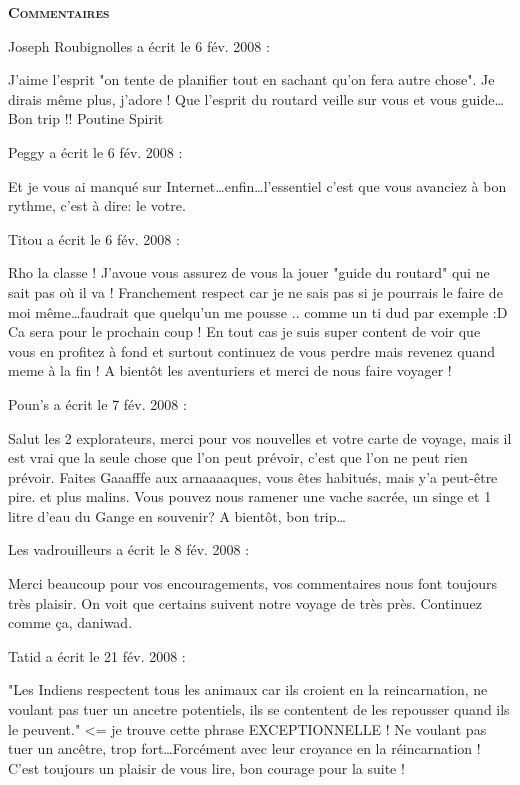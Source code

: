 \bigskip
\textbf{\textsc{Commentaires}}

\medskip
Joseph Roubignolles a écrit le 6 fév. 2008 :
\begin{displayquote}
J'aime l'esprit "on tente de planifier tout en sachant qu'on fera autre chose". Je dirais même plus, j'adore ! Que l'esprit du routard veille sur vous et vous guide\dots
Bon trip !!
Poutine Spirit
\end{displayquote}

\medskip
Peggy a écrit le 6 fév. 2008 :
\begin{displayquote}
Et je vous ai manqué sur Internet\dots enfin\dots l'essentiel c'est que vous avanciez à bon rythme, c'est à dire: le votre.
\end{displayquote}

\medskip
Titou a écrit le 6 fév. 2008 :
\begin{displayquote}
Rho la classe ! J'avoue vous assurez de vous la jouer "guide du routard" qui ne sait pas où il va ! Franchement respect car je ne sais pas si je pourrais le faire de moi même\dots faudrait que quelqu'un me pousse .. comme un ti dud par exemple :D Ca sera pour le prochain coup ! En tout cas je suis super content de voir que vous en profitez à fond et surtout continuez de vous perdre mais revenez quand meme à la fin ! A bientôt les aventuriers et merci de nous faire voyager !
\end{displayquote}

\medskip
Poun's a écrit le 7 fév. 2008 :
\begin{displayquote}
Salut  les 2 explorateurs, merci pour vos nouvelles et votre carte de voyage, mais il est vrai que la seule chose que l'on peut prévoir, c'est que l'on ne peut rien prévoir. Faites Gaaafffe aux arnaaaaques, vous êtes habitués, mais y'a peut-être pire. et plus malins.
Vous pouvez nous ramener une vache sacrée, un singe et 1 litre d'eau du Gange en souvenir?
A bientôt, bon trip\dots
\end{displayquote}

\medskip
Les vadrouilleurs a écrit le 8 fév. 2008 :
\begin{displayquote}
Merci beaucoup pour vos encouragements, vos commentaires nous font toujours très plaisir. On voit que certains suivent notre voyage de très près.
Continuez comme ça, daniwad.
\end{displayquote}

\medskip
Tatid a écrit le 21 fév. 2008 :
\begin{displayquote}
"Les Indiens respectent tous les animaux car ils croient en la reincarnation, ne voulant pas tuer un ancetre potentiels, ils se contentent de les repousser quand ils le peuvent." <= je trouve cette phrase EXCEPTIONNELLE ! Ne voulant pas tuer un ancêtre, trop fort\dots Forcément avec leur croyance en la réincarnation !
C'est toujours un plaisir de vous lire, bon courage pour la suite !
\end{displayquote}

\vfill
